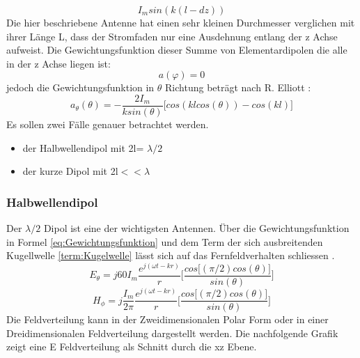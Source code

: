 \begin{equation}
I_{m}sin(k(l-dz))
\end{equation}
Die hier beschriebene Antenne hat einen sehr kleinen Durchmesser verglichen mit ihrer Länge L, dass der Stromfaden nur eine Ausdehnung entlang der z Achse aufweist. Die Gewichtungsfunktion dieser Summe von Elementardipolen die alle in der z Achse liegen ist:
\begin{equation}
a(\varphi)= 0
\end{equation}
jedoch die Gewichtungsfunktion in $\theta$ Richtung beträgt nach R. Elliott \cite{elliott1981antenna}:
\begin{equation}\label{eq:Gewichtungsfunktion}
a_{\theta}(\theta)=- \frac{2I_{m}}{k sin(\theta)} \lbrack cos(kl cos(\theta)) - cos(kl) \rbrack
\end{equation}
Es sollen zwei Fälle genauer betrachtet werden.
\begin{itemize}
\item der Halbwellendipol mit 2l= $\lambda/2$
\item der kurze Dipol mit 2l$<<\lambda$
\end{itemize}
\subsubsection{Halbwellendipol}
Der $\lambda/2$ Dipol ist eine der wichtigsten Antennen. Über die Gewichtungsfunktion in Formel \ref{eq:Gewichtungsfunktion} und dem Term der sich ausbreitenden Kugellwelle \ref{term:Kugelwelle} lässt sich auf das Fernfeldverhalten schliessen \cite{elliott1981antenna}.
\begin{equation}
E_{\theta}=j60I_{m} \frac{e^{j(\omega t - kr)}}{r} \lbrack \frac{cos\lbrack  (\pi/2) cos(\theta)\rbrack}{sin(\theta)} \rbrack
\end{equation}
\begin{equation}
H_{\phi}=j \frac{I_{m}}{2\pi} \frac{e^{j(\omega t - kr)}}{r} \lbrack \frac{cos\lbrack  (\pi/2) cos(\theta)\rbrack}{sin(\theta)} \rbrack
\end{equation}
Die Feldverteilung kann in der  Zweidimensionalen Polar Form oder in einer Dreidimensionalen Feldverteilung dargestellt werden.
Die nachfolgende Grafik zeigt eine E Feldverteilung als Schnitt durch die xz Ebene.\\

